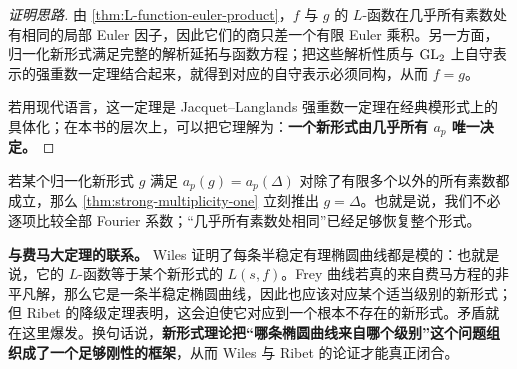\begin{proof}[证明思路]
由 \cref{thm:L-function-euler-product}，$f$ 与 $g$ 的 $L$-函数在几乎所有素数处有相同的局部 Euler 因子，因此它们的商只差一个有限 Euler 乘积。另一方面，归一化新形式满足完整的解析延拓与函数方程；把这些解析性质与 $\mathrm{GL}_2$ 上自守表示的强重数一定理结合起来，就得到对应的自守表示必须同构，从而 $f=g$。

若用现代语言，这一定理是 Jacquet--Langlands 强重数一定理在经典模形式上的具体化；在本书的层次上，可以把它理解为：\textbf{一个新形式由几乎所有 $a_p$ 唯一决定。}
\end{proof}

\begin{example}[为什么这一定理如此强]
若某个归一化新形式 $g$ 满足 $a_p(g)=a_p(\Delta)$ 对除了有限多个以外的所有素数都成立，那么 \cref{thm:strong-multiplicity-one} 立刻推出 $g=\Delta$。也就是说，我们不必逐项比较全部 Fourier 系数；“几乎所有素数处相同”已经足够恢复整个形式。
\end{example}

\textbf{与费马大定理的联系。}
Wiles 证明了每条半稳定有理椭圆曲线都是模的：也就是说，它的 $L$-函数等于某个新形式的 $L(s,f)$。Frey 曲线若真的来自费马方程的非平凡解，那么它是一条半稳定椭圆曲线，因此也应该对应某个适当级别的新形式；但 Ribet 的降级定理表明，这会迫使它对应到一个根本不存在的新形式。矛盾就在这里爆发。换句话说，\textbf{新形式理论把“哪条椭圆曲线来自哪个级别”这个问题组织成了一个足够刚性的框架}，从而 Wiles 与 Ribet 的论证才能真正闭合。


